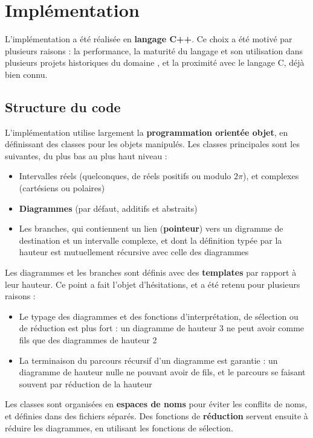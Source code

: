 \chapter{Implémentation}
\label{ch:Implementation}

L’implémentation a été réalisée en \textbf{langage C++}. Ce choix a été motivé par plusieurs raisons : la performance, la maturité du langage et son utilisation dans plusieurs projets historiques du domaine \cite{Bichsel_2023}, et la proximité avec le langage C, déjà bien connu.

\section{Structure du code}

L'implémentation utilise largement la \textbf{programmation orientée objet}, en définissant des classes pour les objets manipulés. Les classes principales sont les suivantes, du plus bas au plus haut niveau :
\begin{itemize}
  \item Intervalles réels (quelconques, de réels positifs ou modulo $2\pi$), et complexes (cartésiens ou polaires)
  \item \textbf{Diagrammes} (par défaut, additifs et abstraits)
  \item Les branches, qui contiennent un lien (\textbf{pointeur}) vers un digramme de destination et un intervalle complexe, et dont la définition typée par la hauteur est mutuellement récursive avec celle des diagrammes
\end{itemize}

Les diagrammes et les branches sont définis avec des \textbf{templates} par rapport à leur hauteur. Ce point a fait l'objet d'hésitations, et a été retenu pour plusieurs raisons :
\begin{itemize}
  \item Le typage des diagrammes et des fonctions d'interprétation, de sélection ou de réduction est plus fort : un diagramme de hauteur 3 ne peut avoir comme fils que des diagrammes de hauteur 2
  \item La terminaison du parcours récursif d'un diagramme est garantie : un diagramme de hauteur nulle ne pouvant avoir de fils, et le parcours se faisant souvent par réduction de la hauteur
\end{itemize}

Les classes sont organisées en \textbf{espaces de noms} pour éviter les conflits de noms, et définies dans des fichiers séparés. Des fonctions de \textbf{réduction} servent ensuite à réduire les diagrammes, en utilisant les fonctions de sélection.

